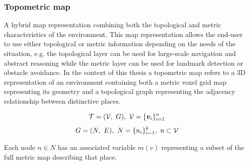 \subsubsection{Topometric map}
A hybrid map representation combining both the topological and metric characteristics of the environment. This map representation allows the end-user to use either topological or metric information depending on the needs of the situation, e.g. the topological layer can be used for large-scale navigation and abstract reasoning while the metric layer can be used for landmark detection or obstacle avoidance. In the context of this thesis a topometric map refers to a 3D representation of an environment containing both a metric voxel grid map representing its geometry and a topological graph representing the adjacency relationship between distinctive places. 

\begin{equation}
    \label{eq:topometricmap}
    \topometricmap = (\voxelgrid,\ G),\ \voxelgrid=\{\voxel_{i}\}_{i=1}^{n}
\end{equation}
\begin{equation}
    \label{eq:place_subset}
    G=(N,\ E),\ N=\{n_i\}_{i=1}^k,\ n \subset \mathcal{V}
\end{equation}

Each node \(n \in N\) has an associated variable \(m(v)\) representing a subset of the full metric map describing that place.
